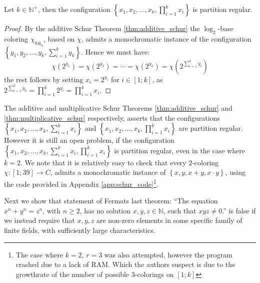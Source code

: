 \begin{theorem}\label{thm:multiplicative_schur}
	Let $k \in \mathbb{N}^{+}$, then the configuration $\left\{x_1, x_2, \ldots, x_{k}, \prod_{i = 1}^k x_i\right\}$ is partition regular.
\end{theorem}
\begin{proof}
	By the additive Schur Theorem \ref{thm:additive_schur} the $\log_2$-base coloring $\chi_{\log_2}$, based on $\chi$, admits a monochromatic instance of the configuration $\left\{y_1, y_2, \ldots, y_{k}, \sum_{i = 1}^k y_k\right\}$. Hence we must have:
	\begin{equation*}
		\chi(2^{y_1}) = \chi(2^{y_{2}}) = \cdots = \chi(2^{y_k}) = \chi \left(2^{\sum_{i = 1}^k y_{i}}\right)
	\end{equation*}
	the rest follows by setting $x_i = 2^{y_i}$ for $i \in [1; k]$, as $2^{\sum_{i = 1}^k y_k} = \prod_{i = 1}^k 2^{y_i} = \prod_{i = 1}^k x_i$.
\end{proof}
\newpage
The additive and multiplicative Schur Theorems \ref{thm:additive_schur} and \ref{thm:multiplicative_schur} respectively, asserts that the configurations $\left\{x_1, x_2, \ldots, x_{k}, \sum^k_{i = 1} x_i\right\}$ and $\left\{x_1, x_2, \ldots, x_{k}, \prod^k_{i = 1} x_i\right\}$ are partition regular. However it is still an open problem, if the configuration $\left\{x_1, x_2, \ldots, x_{k}, \sum_{i = 1}^k x_i, \prod_{i = 1}^k x_i\right\}$ is partition regular, even in the case where $k = 2$. We note that it is relatively easy to check that every $2$-coloring $\chi: [1; 39] \to C$, admits a monochromatic instance of $\left\{x, y, x + y, x \cdot y\right\}$, using the code provided in Appendix \ref{app:schur_code}\footnote{The case where $k = 2$, $r = 3$ was also attempted, however the program crashed due to a lack of RAM. Which the authors suspect is due to the growthrate of the number of possible $3$-colorings on $[1; k]$}.

Next we show that statement of Fermats last theorem: ``The equation $x^n + y^n = z^n$, with $n \geq 2$, has no solution $x, y, z \in \mathbb{N}$, such that $xyz \neq 0$.'' is false if we instead require that $x, y, z$ are non-zero elements in some specific family of finite fields, with sufficiently large characteristics.

